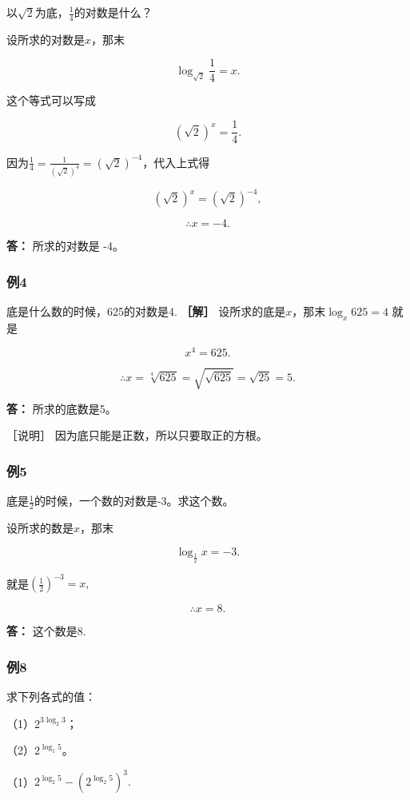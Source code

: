以\(\sqrt{2}\)为底，\(\frac{1}{4}\)的对数是什么？

 设所求的对数是\(x\)，那末

\[
\log_{\sqrt{2}} \frac{1}{4} = x.
\]

这个等式可以写成

\[
(\sqrt{2})^{x} = \frac{1}{4}.
\]

因为\(\frac{1}{4} = \frac{1}{(\sqrt{2})^4} = (\sqrt{2})^{-4}\)，代入上式得

\[
(\sqrt{2})^{x} = (\sqrt{2})^{- 4},
\]

\[
\therefore x = - 4.
\]

\textbf{答：} 所求的对数是 -4。

\subsubsection{例4}

底是什么数的时候，625的对数是4. \textbf{［解］}
设所求的底是\(x\)，那末\(\log_{x}625 = 4\) 就是

\[
x^{4} = 625.
\]

\[
\therefore x = \sqrt[4]{625} = \sqrt{\sqrt{625}} = \sqrt{25} = 5.
\]

\textbf{答：} 所求的底数是5。

［说明］ 因为底只能是正数，所以只要取正的方根。

\subsubsection{例5}

底是\(\frac{1}{2}\)的时候，一个数的对数是-3。求这个数。

 设所求的数是\(x\)，那末

\[
\log_{\frac{1}{2}} x = - 3.
\]

就是\(\left(\frac{1}{2}\right)^{-3} = x,\)

\[
\therefore x = 8.
\]

\textbf{答：} 这个数是8.

\subsubsection{例8}

求下列各式的值：

（1）\(2^{3 \log_{2} 3}\)；

（2）\(2^{\log_{1}5}\)。

 （1）\(2^{\log_{2}5} - (2^{\log_{2}5})^3.\)

